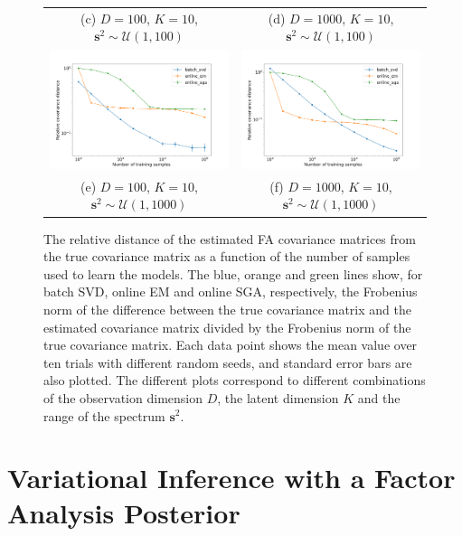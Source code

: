 \documentclass[msc,deptreport.inf]{infthesis} %
\newcommand{\matr}[1]{\mathbf{#1}}
\begin{document}
\begin{figure}[!htbp]
\begin{tabular}{cc}
		 (c) $D=100$, $K=10$, $\matr{s}^2 \sim \mathcal{U}(1, 100)$ 
		 & (d) $D=1000$, $K=10$, $\matr{s}^2 \sim \mathcal{U}(1, 100)$\\[6pt]
		 \includegraphics[width=70mm]{plots/online_fa_covar_distance__observation_dim=100__latent_dim=10__spectrum_min=1__spectrum_max=1000.png}
		 & \includegraphics[width=70mm]{plots/online_fa_covar_distance__observation_dim=1000__latent_dim=10__spectrum_min=1__spectrum_max=1000.png} \\
		 (e) $D=100$, $K=10$, $\matr{s}^2 \sim \mathcal{U}(1, 1000)$ 
		 & (f) $D=1000$, $K=10$, $\matr{s}^2 \sim \mathcal{U}(1, 1000)$\\[6pt]
	\end{tabular}
	\caption{The relative distance of the estimated FA covariance matrices from the true covariance matrix as a function of the number of samples used to learn the models. The blue, orange and green lines show, for batch SVD, online EM and online SGA, respectively, the Frobenius norm of the difference between the true covariance matrix and the estimated covariance matrix divided by the Frobenius norm of the true covariance matrix. Each data point shows the mean value over ten trials with different random seeds, and standard error bars are also plotted. The different plots correspond to different combinations of the observation dimension $D$, the latent dimension $K$ and the range of the spectrum $\matr{s}^2$.} 
	\label{fig:fa_covar_distance}
\end{figure}


\chapter{Variational Inference with a Factor Analysis Posterior}\label{ch:vifa}
\end{document}
